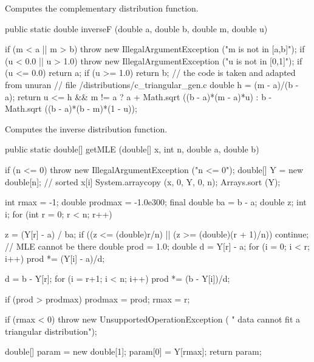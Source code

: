   \begin{tabb}
  Computes the complementary distribution function.
 \end{tabb}
\begin{code}

   public static double inverseF (double a, double b, double m, double u)\begin{hide} {
      if (m < a || m > b)
         throw new IllegalArgumentException ("m is not in [a,b]");
      if (u < 0.0 || u > 1.0)
         throw new IllegalArgumentException ("u is not in [0,1]");
      if (u <= 0.0)
         return a;
      if (u >= 1.0)
         return b;
       // the code is taken and adapted from unuran
       // file /distributions/c_triangular_gen.c
       double h = (m - a)/(b - a);
       return u <= h && m != a ? a + Math.sqrt ((b - a)*(m - a)*u) 
                : b - Math.sqrt ((b - a)*(b - m)*(1 - u));
   }\end{hide}
\end{code}
  \begin{tabb}
  Computes the inverse distribution function.
 \end{tabb}
\begin{code}

   public static double[] getMLE (double[] x, int n, double a, double b)\begin{hide} {
      if (n <= 0)
         throw new IllegalArgumentException ("n <= 0");
      double[] Y = new double[n];   // sorted x[i]
      System.arraycopy (x, 0, Y, 0, n);
      Arrays.sort (Y);

      int rmax = -1;
      double prodmax = -1.0e300;
      final double ba = b - a;
      double z;
      int i;
      for (int r = 0; r < n; r++) {
         z = (Y[r] - a) / ba;
         if ((z <= (double)r/n) || (z >= (double)(r + 1)/n))
            continue;    // MLE cannot be there
         double prod = 1.0;
         double d = Y[r] - a;
         for (i = 0; i < r; i++)
            prod *= (Y[i] - a)/d;
         
         d = b - Y[r];
         for (i = r+1; i < n; i++)
            prod *= (b - Y[i])/d;

         if (prod > prodmax) {
            prodmax = prod;
            rmax = r;
         }
      }
      
      if (rmax < 0)
         throw new UnsupportedOperationException (
            "   data cannot fit a triangular distribution");

      double[] param = new double[1];
      param[0] = Y[rmax];
      return param;
   }\end{hide}
\end{code}
